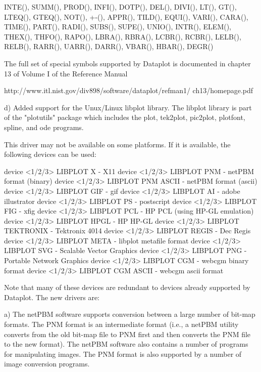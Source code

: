 {                    INTE(), SUMM(), PROD(), INFI(), DOTP(),
                    DEL(), DIVI(), LT(), GT(), LTEQ(), GTEQ(),
                    NOT(), +-(), APPR(), TILD(), EQUI(), VARI(),
                    CARA(), TIME(), PART(), RADI(), SUBS(),
                    SUPE(), UNIO(), INTR(), ELEM(), THEX(),
                    THFO(), RAPO(), LBRA(), RBRA(), LCBR(),
                    RCBR(), LELB(), RELB(), RARR(), UARR(),
                    DARR(), VBAR(), HBAR(), DEGR() 

           The full set of special symbols supported by Dataplot
           is documented in chapter 13 of Volume I of the
           Reference Manual

           http://www.itl.nist.gov/div898/software/dataplot/refman1/
           ch13/homepage.pdf

    d) Added support for the Unux/Linux libplot library.  The libplot
       library is part of the "plotutils" package which includes the
       plot, tek2plot, pic2plot, plotfont, spline, and ode programs.

       This driver may not be available on some platforms.  If it
       is available, the following devices can be used:

          device <1/2/3>  LIBPLOT X           - X11
          device <1/2/3>  LIBPLOT PNM         - netPBM format (binary)
          device <1/2/3>  LIBPLOT PNM ASCII   - netPBM format (ascii)
          device <1/2/3>  LIBPLOT GIF         - gif
          device <1/2/3>  LIBPLOT AI          - adobe illustrator
          device <1/2/3>  LIBPLOT PS          - postscript
          device <1/2/3>  LIBPLOT FIG         - xfig
          device <1/2/3>  LIBPLOT PCL         - HP PCL (using HP-GL emulation)
          device <1/2/3>  LIBPLOT HPGL        - HP HP-GL
          device <1/2/3>  LIBPLOT TEKTRONIX   - Tektronix 4014
          device <1/2/3>  LIBPLOT REGIS       - Dec Regis
          device <1/2/3>  LIBPLOT META        - libplot metafile format
          device <1/2/3>  LIBPLOT SVG         - Scalable Vector Graphics
          device <1/2/3>  LIBPLOT PNG         - Portable Network Graphics
          device <1/2/3>  LIBPLOT CGM         - webcgm binary format
          device <1/2/3>  LIBPLOT CGM ASCII   - webcgm ascii format

        Note that many of these devices are redundant to devices already
        supported by Dataplot.  The new drivers are:

        a) The netPBM software supports conversion between a large number of
           bit-map formats.  The PNM format is an intermediate format (i.e.,
           a netPBM utility converts from the old bit-map file to PNM first
           and then converts the PNM file to the new format).  The netPBM
           software also contains a number of programs for manipulating
           images.  The PNM format is also supported by a number of
           image conversion programs.

}
